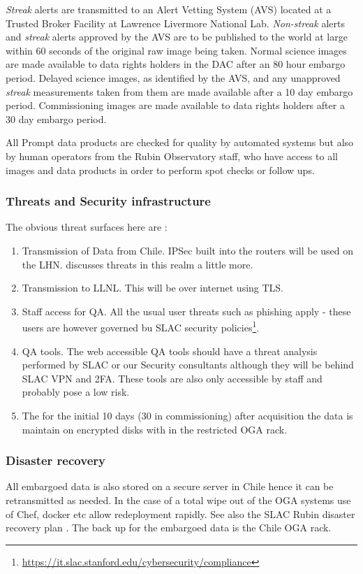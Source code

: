 \emph{Streak} alerts are transmitted to an \gls{Alert} Vetting System (AVS) located at a Trusted Broker Facility at  Lawrence Livermore National Lab.
\emph{Non-streak} alerts and \emph{streak} alerts approved by the \gls{AVS} are to be published to the world at large within 60 seconds of the original raw image being taken.
Normal science images are made available to data rights holders in the \gls{DAC} after an 80 hour embargo period.
Delayed science images, as identified by the \gls{AVS}, and any unapproved \emph{streak} measurements taken from them are made available after a 10 day embargo period. Commissioning images are made available to data rights holders after a 30 day embargo period.

All Prompt data products are checked for quality by automated systems but also by human operators from the Rubin Observatory staff, who have access to all images and data products in order to perform spot checks or follow ups.

\subsubsection{ Threats and Security infrastructure}
The obvious threat surfaces here are :
\begin{enumerate}
\item Transmission of Data from Chile. IPSec built into the routers will be used on the \gls{LHN}.  discusses threats in this realm a little more.
\item Transmission to \gls{LLNL}.  This will be over internet using TLS.
\item Staff access for \gls{QA}. All the usual user threats such as phishing apply - these users are however governed bu SLAC security policies\footnote{\url{https://it.slac.stanford.edu/cybersecurity/compliance}}.
\item QA tools. The web accessible QA tools should have a threat analysis performed by SLAC or our Security consultants although they will be behind SLAC \gls{VPN} and 2FA. These tools are also only accessible by staff and probably pose a low risk.
\item The for the initial 10 days (30 in commissioning) after acquisition the data is maintain on encrypted disks with in the restricted \gls{OGA} rack.
\end{enumerate}

\subsubsection{Disaster recovery}
All embargoed data is also stored on a secure server in Chile hence it can be retransmitted as needed.
In the case of a total wipe out of the \gls{OGA} systems use of Chef, docker etc allow redeployment rapidly.
See also the \gls{SLAC} Rubin disaster recovery plan .
The back up for the embargoed data is the Chile OGA rack.

